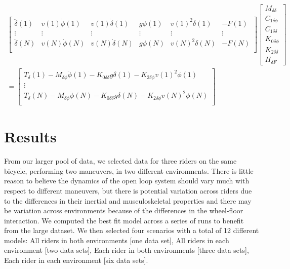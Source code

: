 \documentclass[a4paper]{article}
\begin{document}
\begin{align}
  \begin{bmatrix}
    \ddot{\delta}(1) &
    v(1) \dot{\phi}(1) &
    v(1) \dot{\delta}(1) &
    g \phi(1) &
    v(1)^2 \delta(1) &
    - F(1)\\
    \vdots & \vdots & \vdots & \vdots & \vdots & \vdots \\
    \ddot{\delta}(N) &
    v(N) \dot{\phi}(N) &
    v(N) \dot{\delta}(N) &
    g \phi(N) &
    v(N)^2 \delta(N) &
    - F(N)\\
  \end{bmatrix}
  \begin{bmatrix}
    M_{\delta\delta} \\
    C_{1\delta\phi} \\
    C_{1\delta\delta} \\
    K_{0\delta\phi} \\
    K_{2\delta\delta} \\
    H_{\delta F}
  \end{bmatrix} \nonumber \\
  =
  \begin{bmatrix}
    T_\delta(1)
    - M_{\delta\phi} \ddot{\phi}(1)
    - K_{0\delta\delta} g \delta(1)
    - K_{2\delta\phi} v(1)^2 \phi(1) \\
    \vdots\\
    T_\delta(N)
    - M_{\delta\phi} \ddot{\phi}(N)
    - K_{0\delta\delta} g \delta(N)
    - K_{2\delta\phi} v(N)^2 \phi(N) \\
  \end{bmatrix}
\end{align}

\section*{Results}

From our larger pool of data, we selected data for three riders on the same
bicycle, performing two maneuvers, in two different environments. There is
little reason to believe the dynamics of the open loop system should vary much
with respect to different maneuvers, but there is potential variation across
riders due to the differences in their inertial and musculoskeletal properties
and there may be variation across environments because of the differences in
the wheel-floor interaction. We computed the best fit model across a series of
runs to benefit from the large dataset. We then selected four scenarios with a
total of 12 different models: All riders in both environments [one data set],
All riders in each environment [two data sets], Each rider in both environments
[three data sets], Each rider in each environment [six data sets].
\end{document}
